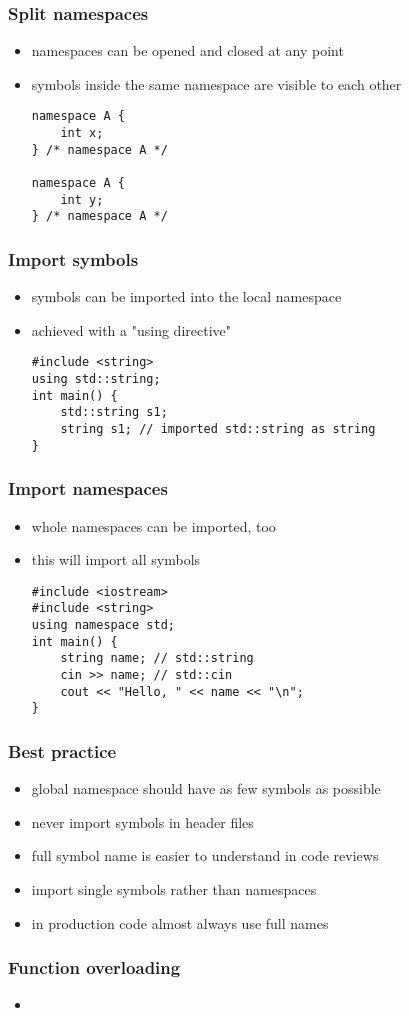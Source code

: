 \begin{frame}[fragile]
    \frametitle{Split namespaces}
    \begin{itemize}
        \item namespaces can be opened and closed at any point
        \item symbols inside the same namespace are visible to each other
        \begin{lstlisting}[numbers=none]
namespace A {
    int x;
} /* namespace A */

namespace A {
    int y;
} /* namespace A */
        \end{lstlisting}
    \end{itemize}
\end{frame}

\begin{frame}[fragile]
    \frametitle{Import symbols}
    \begin{itemize}
        \item symbols can be imported into the local namespace
        \item achieved with a "using directive"
        \begin{lstlisting}
#include <string>
using std::string;
int main() {
    std::string s1;
    string s1; // imported std::string as string
}
        \end{lstlisting}
    \end{itemize}
\end{frame}

\begin{frame}[fragile]
    \frametitle{Import namespaces}
    \begin{itemize}
        \item whole namespaces can be imported, too
        \item this will import all symbols
        \begin{lstlisting}
#include <iostream>
#include <string>
using namespace std;
int main() {
    string name; // std::string
    cin >> name; // std::cin
    cout << "Hello, " << name << "\n";
}
        \end{lstlisting}
    \end{itemize}
\end{frame}

\begin{frame}[fragile]
    \frametitle{Best practice}
    \begin{itemize}
        \item global namespace should have as few symbols as possible
        \item never import symbols in header files
        \item full symbol name is easier to understand in code reviews
        \item import single symbols rather than namespaces
        \item in production code almost always use full names
    \end{itemize}
\end{frame}

\begin{frame}[fragile]
    \frametitle{Function overloading}
    \begin{itemize}
        \item 
    \end{itemize}
\end{frame}


